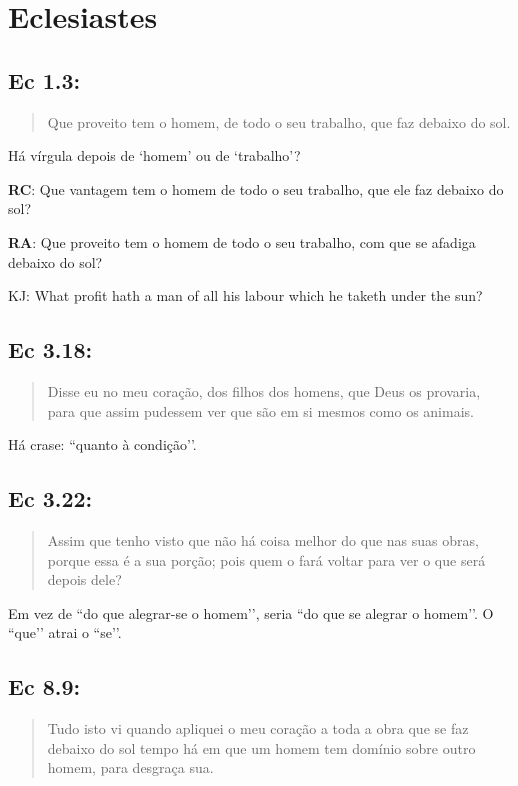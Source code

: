 \section{Eclesiastes}
\subsection*{Ec 1.3:} 
 \begin{quote}
  \small
 Que proveito tem o homem, de todo o seu trabalho, que faz debaixo do sol.
\end{quote}

Há vírgula depois de `homem’ ou de `trabalho’?

\textbf{RC}: Que vantagem tem o homem de todo o seu trabalho, que ele faz debaixo do sol?

\textbf{RA}: Que proveito tem o homem de todo o seu trabalho, com que se afadiga debaixo do sol?

KJ: What profit hath a man of all his labour which he taketh under the sun?

\subsection*{Ec 3.18:} 
 \begin{quote}
  \small
 Disse eu no meu coração,  dos filhos dos homens, que Deus os provaria, para que assim pudessem ver que são em si mesmos como os animais.
\end{quote}

Há crase: ``quanto à condição’’.

\subsection*{Ec 3.22:} 
 \begin{quote}
  \small
 Assim que tenho visto que não há coisa melhor do que  nas suas obras, porque essa é a sua porção; pois quem o fará voltar para ver o que será depois dele?
\end{quote}

 Em vez de ``do que alegrar-se o homem’’, seria ``do que se alegrar o homem’’. O ``que’’ atrai o ``se’’.

\subsection*{Ec 8.9:} 
 \begin{quote}
  \small
 Tudo isto vi quando apliquei o meu coração a toda a obra que se faz debaixo do sol\uwave{;} tempo há em que um homem tem domínio sobre outro homem, para desgraça sua.
 \end{quote}
 
